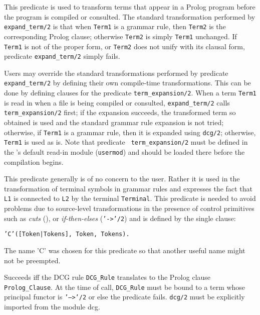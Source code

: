 \begin{description}
    This predicate is used to transform terms that appear in a Prolog program
    before the program is compiled or consulted.
    The standard transformation performed by {\tt expand\_term/2} is that 
    when {\tt Term1} is a grammar rule, then {\tt Term2} is the corresponding
    Prolog clause; otherwise {\tt Term2} is simply {\tt Term1} unchanged. If
    {\tt Term1} is not of the proper form, or {\tt Term2} does not unify with
    its clausal form, predicate {\tt expand\_term/2} simply fails.

    Users may override the standard transformations performed by predicate
    {\tt expand\_term/2} by defining their own compile-time transformations.
    This can be done by defining clauses for the predicate
    {\tt term\_expansion/2}.
    When a term {\tt Term1} is read in when a file is being compiled or 
    consulted, {\tt expand\_term/2} calls {\tt term\_expansion/2} first;
    if the expansion succeeds, the transformed term so obtained is used and 
    the standard grammar rule expansion is not tried; otherwise, if 
    {\tt Term1} is a grammar rule, then it is expanded using {\tt dcg/2}; 
    otherwise, {\tt Term1} is used as is.  Note that predicate {\tt
    term\_expansion/2} must be defined in the \ourprolog's default read-in
    module ({\tt usermod}) and should be loaded there before the compilation
    begins.

    This predicate generally is of no concern to the user.  Rather it is used 
    in the transformation of terminal symbols in 
    grammar rules and expresses the fact that {\tt L1} is connected 
    to {\tt L2} by the terminal {\tt Terminal}. This predicate is
    needed to avoid problems due to source-level
    transformations in the presence of control primitives such as
    {\em cuts} (\cut), or {\em if-then-elses} 
    ({\tt '->'/2}) and is defined by the single clause:
    \begin{center}
                {\tt 'C'([Token|Tokens], Token, Tokens).}
    \end{center}
    The name 'C' was chosen for this predicate so that another useful
    name might not be preempted.

    Succeeds iff the DCG rule {\tt DCG\_Rule} translates to the Prolog
    clause {\tt Prolog\_Clause}.  At the time of call, {\tt DCG\_Rule}
    must be bound to a term whose principal functor is {\tt '-->'/2}
    or else the predicate fails.  {\tt dcg/2} must be explicitly
    imported from the module {\sf dcg}.

\end{description}


